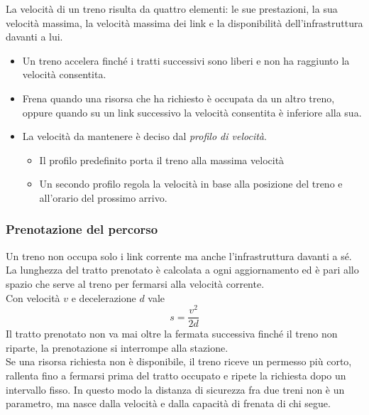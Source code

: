 La velocità di un treno risulta da quattro elementi: le sue prestazioni, la sua velocità massima, la velocità massima dei link e la disponibilità dell'infrastruttura davanti a lui. \\
\begin{itemize}
    \item Un treno accelera finché i tratti successivi sono liberi e non ha raggiunto la velocità consentita.
    \item Frena quando una risorsa che ha richiesto è occupata da un altro treno, oppure quando su un link successivo la velocità consentita è inferiore alla sua.
    \item La velocità da mantenere è deciso dal \textit{profilo di velocità}. 
    \begin{itemize}
        \item Il profilo predefinito porta il treno alla massima velocità
        \item Un secondo profilo regola la velocità in base alla posizione del treno e all'orario del prossimo arrivo.
    \end{itemize}
\end{itemize}

\subsubsection{Prenotazione del percorso}
Un treno non occupa solo i link corrente ma anche l'infrastruttura davanti a sé. \\
La lunghezza del tratto prenotato è calcolata a ogni aggiornamento ed è pari allo spazio che serve al treno per fermarsi alla velocità corrente. \\
Con velocità $v$ e decelerazione $d$ vale
\begin{equation}
	s = \frac{v^2}{2d}
\end{equation}
Il tratto prenotato non va mai oltre la fermata successiva finché il treno non riparte, la prenotazione si interrompe alla stazione. \\
Se una risorsa richiesta non è disponibile, il treno riceve un permesso più corto, rallenta fino a fermarsi prima del tratto occupato e ripete la richiesta dopo un intervallo fisso. In questo modo la distanza di sicurezza fra due treni non è un parametro, ma nasce dalla velocità e dalla capacità di frenata di chi segue.


